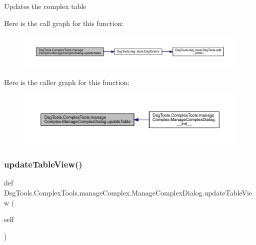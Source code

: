 \begin{DoxyVerb}Updates the complex table
\end{DoxyVerb}
 Here is the call graph for this function\+:
\nopagebreak
\begin{figure}[H]
\begin{center}
\leavevmode
\includegraphics[width=350pt]{class_dsg_tools_1_1_complex_tools_1_1manage_complex_1_1_manage_complex_dialog_aca5f214b97781c877690fadcd7bece00_cgraph}
\end{center}
\end{figure}
Here is the caller graph for this function\+:
\nopagebreak
\begin{figure}[H]
\begin{center}
\leavevmode
\includegraphics[width=350pt]{class_dsg_tools_1_1_complex_tools_1_1manage_complex_1_1_manage_complex_dialog_aca5f214b97781c877690fadcd7bece00_icgraph}
\end{center}
\end{figure}
\mbox{\label{class_dsg_tools_1_1_complex_tools_1_1manage_complex_1_1_manage_complex_dialog_afe2e6fe71eeb7263f7526ec50014edb4}} 
\subsubsection{\texorpdfstring{update\+Table\+View()}{updateTableView()}}
{\footnotesize\ttfamily def Dsg\+Tools.\+Complex\+Tools.\+manage\+Complex.\+Manage\+Complex\+Dialog.\+update\+Table\+View (\begin{DoxyParamCaption}\item[{}]{self }\end{DoxyParamCaption})}

